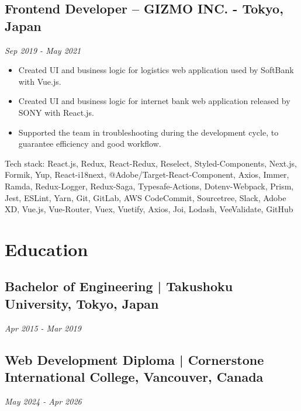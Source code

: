 \documentclass{article}
\begin{document}
\subsection*{Frontend Developer – GIZMO INC. - Tokyo, Japan}
\textit{Sep 2019 - May 2021}
\begin{itemize}[leftmargin=*, itemsep=0pt]
    \item Created UI and business logic for logistics web application used by SoftBank with Vue.js.
    \item Created UI and business logic for internet bank web application released by SONY with React.js.
    \item Supported the team in troubleshooting during the development cycle, to guarantee efficiency and good workflow.
\end{itemize}
Tech stack: React.js, Redux, React-Redux, Reselect, Styled-Components, Next.js, Formik, Yup, React-i18next, @Adobe/Target-React-Component, Axios, Immer, Ramda, Redux-Logger, Redux-Saga, Typesafe-Actions, Dotenv-Webpack, Prism, Jest, ESLint, Yarn, Git, GitLab, AWS CodeCommit, Sourcetree, Slack, Adobe XD, Vue.js, Vue-Router, Vuex, Vuetify, Axios, Joi, Lodash, VeeValidate, GitHub

\section*{Education}

\subsection*{Bachelor of Engineering | Takushoku University, Tokyo, Japan}
\textit{Apr 2015 - Mar 2019}

\subsection*{Web Development Diploma | Cornerstone International College, Vancouver, Canada}
\textit{May 2024 - Apr 2026}
\end{document}
